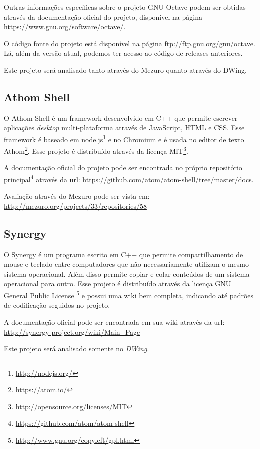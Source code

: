 Outras informações específicas sobre o projeto GNU Octave podem ser obtidas através da documentação oficial do projeto, disponível na página \url{https://www.gnu.org/software/octave/}.

O código fonte do projeto está disponível na página \url{ftp://ftp.gnu.org/gnu/octave}. Lá, além da versão atual, podemos ter acesso ao código de releases anteriores.

Este projeto será analisado tanto através do Mezuro quanto através do DWing.


\subsection{Athom Shell}
\label{section-athom}

O Athom Shell é um framework desenvolvido em C++ que permite escrever aplicações \emph{desktop} multi-plataforma através de JavaScript, HTML e CSS. Esse framework é baseado em node.js\footnote{\url{http://nodejs.org/}} e no Chromium e é usada no editor de texto Athom\footnote{\url{https://atom.io/}}. Esse projeto é distribuído através da licença MIT\footnote{\url{http://opensource.org/licenses/MIT}}.

A documentação oficial do projeto pode ser encontrada no próprio repositório principal\footnote{\url{https://github.com/atom/atom-shell}} através da url: \url{https://github.com/atom/atom-shell/tree/master/docs}.

Avaliação através do Mezuro pode ser vista em: \url{http://mezuro.org/projects/33/repositories/58}

\subsection{Synergy}
\label{section-synergy}

O Synergy é um programa escrito em C++ que permite compartilhamento de mouse e teclado entre computadores que não necessariamente utilizam o mesmo sistema operacional. Além disso permite copiar e colar conteúdos de um sistema operacional para outro. Esse projeto é distribuído através da licença GNU General Public License \footnote{\url{http://www.gnu.org/copyleft/gpl.html}} e possui uma wiki bem completa, indicando até padrões de codificação seguidos no projeto.

A documentação oficial pode ser encontrada em sua wiki através da url: \url{http://synergy-project.org/wiki/Main_Page}

Este projeto será analisado somente no \emph{DWing}.

